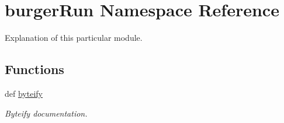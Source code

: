 \hypertarget{namespaceburgerRun}{\section{burger\-Run Namespace Reference}
\label{namespaceburgerRun}
}


Explanation of this particular module.  


\subsection*{Functions}
\begin{DoxyCompactItemize}
\item 
def \hyperlink{namespaceburgerRun_ae9d2c63d3506aca38a4d51cbcc5c8cf9}{byteify}
\begin{DoxyCompactList}\small\item\em Byteify documentation. \end{DoxyCompactList}\end{DoxyCompactItemize}

